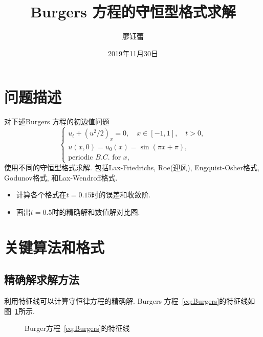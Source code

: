 \documentclass[a4paper, 12pt]{amsart}
\numberwithin{equation}{section}
\begin{document}
\title[Burgers Equation]{Burgers 方程的守恒型格式求解}
\author[Y.L. Liao]{廖钰蕾}
\address{数学与系统科学研究院计算数学与科学工程计算研究所\\
电子邮箱 {\tt: \url{liaoyulei19@mails.ucas.ac.cn}}
}
\date{2019年11月30日}
\maketitle

\section{\bf 问题描述}\hspace*{\fill}\par
对下述Burgers 方程的初边值问题
\begin{equation}\label{eq:Burgers}\begin{cases}
u_t+(u^2/2)_x=0,\quad x\in[-1,1],\quad t>0,\\
u(x,0)=u_0(x)=\sin(\pi x+\pi),\\
\text{periodic }B.C.\text{ for }x,
\end{cases}\end{equation}
使用不同的守恒型格式求解. 包括Lax-Friedrichs, Roe(迎风), Engquist-Osher格式, Godunov格式, 和Lax-Wendroff格式.
\begin{itemize}
\item 计算各个格式在$t=0.15$时的误差和收敛阶.
\item 画出$t=0.5$时的精确解和数值解对比图.
\end{itemize}

\hspace*{\fill}\par\section{\bf 关键算法和格式}
\subsection{精确解求解方法}\hspace*{\fill}\par\hspace*{\fill}\par
利用特征线可以计算守恒律方程的精确解. Burgers 方程~\eqref{eq:Burgers}的特征线如图~\ref{fig:chr}所示.
\begin{figure}[htbp]\centering{}\caption{Burger方程~\ref{eq:Burgers}的特征线}\label{fig:chr}\end{figure}
\end{document}
